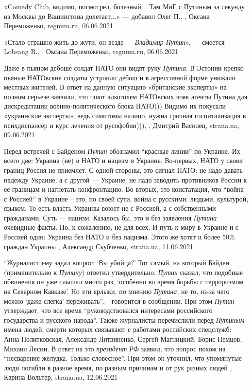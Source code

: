 «Comedy Club, видимо, посмотрел, болезный... Там МиГ с Путиным за секунду из
Москвы до Вашингтона долетает...» — добавил Олег П.,
, Оксана Переможенко, regnum.ru, 06.06.2021

«Стало страшно жить до жути, он везде — \emph{Владимир Путин}», — смеется Lobsang R.,
, Оксана Переможенко, regnum.ru, 06.06.2021

Даже в пьяном дебоше солдат НАТО они видят руку \emph{Путина}.  В Эстонии крепко
пьяные НАТОвские солдаты устроили дебош и в агрессивной форме унижали местных
жителей.  В ответ на данную ситуацию «британские эксперты» на полном серьезе
заявили, что поют алкоголем НАТОвских вояк агенты Путина для дискредитации
военно-политического блока НАТО))) Видимо их покусали «украинские эксперты»,
ведь симптомы налицо, нужна срочная госпитализация в психдиспансер и курс
лечения от русофобии))),
, Дмитрий Василец, strana.ua, 09.06.2021

Перед встречей с Байденом \emph{Путин} обозначил \enquote{красные линии} по
Украине. Их всего две: Украина (не) в НАТО и нацизм в Украине.  Во-первых, НАТО
у своих границ Россия не приемлет. С одной стороны, это сигнал НАТО: не надо
давать надежду Украине, а с другой — Украине: не надо заводить противников
России к её границам и нагнетать конфронтацию.  Во-вторых, это констатация, что
\enquote{война с Россией} в Украине – это, по своей сути, война с русскими:
людьми, культурой, языком. То есть власть Украины воюет не с Россией, а с
собственными гражданами. Суть — нацизм.  Казалось бы, это и без заявления
\emph{Путина} очевидные факты. Но, к сожалению, не для всех. И путь к миру в
Украине и с Россией один: Украина без НАТО и без нацизма. Этого же хотят и
более 50\% граждан Украины
, Александр Скубченко, strana.ua, 11.06.2021

\enquote{Журналист ему задал вопрос: \enquote{Вы убийца?} Тот самый, на который
Байден (применительно к \emph{Путину}) ответил утвердительно. \emph{Путин} сказал, что
подобные обвинения он уже слышал много раз, \enquote{особенно во время борьбы с
терроризмом на Северном Кавказе}. Но эти ярлыки, по мнению \emph{Путина}, не то, из-за
чего можно \enquote{даже слегка} переживать}, - говорится в сообщении.  При
этом \emph{Путин} утверждает, что все время \enquote{руководствовался интересами
российского государства и русского народа}.  Также журналисты перечислили перед
\emph{Путиным} имена людей, смерти которых связывают с работами российских спецслужб:
Анна Политковская, Александр Литвиненко, Сергей Магницкий, Борис Немцов, Михаил
Лесин.  В ответ на это \emph{президент РФ} заявил, что вопрос похож на
\enquote{несварение желудка. Только словесное}. При этом он уточнил, что
упомянутые люди погибли в разное время, по разным причинам и от рук разных
людей
, Карина Вольтер, strana.ua, 12.06.2021

